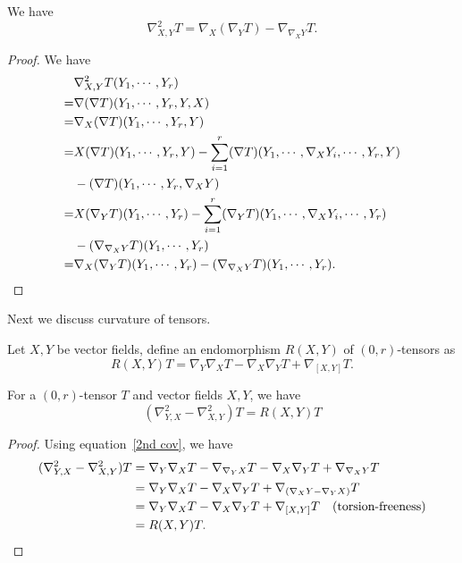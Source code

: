\begin{prop}
    We have
    \begin{equation}
        \nabla^2_{X,Y}T=\nabla_X(\nabla_YT)-\nabla_{\nabla_XY}T.\label{2nd cov}
    \end{equation}
\end{prop}
\begin{proof}
    We have
    \begin{align*}
        &\nabla^2_{X,Y}T(Y_1,\cdots,Y_r)\\
        =&\nabla(\nabla T)(Y_1,\cdots,Y_r,Y,X)\\
        =&\nabla_X(\nabla T)(Y_1,\cdots,Y_r,Y)\\
        =&X(\nabla T)(Y_1,\cdots,Y_r,Y)-\sum_{i=1}^r(\nabla T)(Y_1,\cdots,\nabla_XY_i,\cdots,Y_r,Y)\\
        &-(\nabla T)(Y_1,\cdots,Y_r,\nabla_XY)\\
        =&X(\nabla_YT)(Y_1,\cdots,Y_r)-\sum_{i=1}^r(\nabla_YT)(Y_1,\cdots,\nabla_XY_i,\cdots,Y_r)\\
        &-(\nabla_{\nabla_XY}T)(Y_1,\cdots,Y_r)\\
        =&\nabla_X(\nabla_YT)(Y_1,\cdots,Y_r)-(\nabla_{\nabla_XY}T)(Y_1,\cdots,Y_r).\qedhere
    \end{align*}
\end{proof}

Next we discuss curvature of tensors.

\begin{defn}
    Let $X,Y$ be vector fields, define an endomorphism $R(X,Y)$ of $(0,r)$-tensors as
    \[R(X,Y)T=\nabla_Y\nabla_XT-\nabla_X\nabla_YT+\nabla_{[X,Y]}T.\]
\end{defn}

\begin{prop}
    For a $(0,r)$-tensor $T$ and vector fields $X,Y$, we have
    \[(\nabla^2_{Y,X}-\nabla^2_{X,Y})T=R(X,Y)T\]
\end{prop}
\begin{proof}
    Using equation~\ref{2nd cov}, we have
    \begin{align*}
        (\nabla^2_{Y,X}-\nabla^2_{X,Y})T&=\nabla_Y\nabla_XT-\nabla_{\nabla_YX}T-\nabla_X\nabla_YT+\nabla_{\nabla_XY}T\\
        &=\nabla_Y\nabla_XT-\nabla_X\nabla_YT+\nabla_{(\nabla_XY-\nabla_YX)}T\\
        &=\nabla_Y\nabla_XT-\nabla_X\nabla_YT+\nabla_{[X,Y]}T\quad\text{(torsion-freeness)}\\
        &=R(X,Y)T.\qedhere
    \end{align*}
\end{proof}


